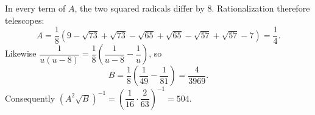In every term of $A$, the two squared radicals differ by $8$. Rationalization therefore telescopes:
\[
A=\dfrac{1}{8}(9-\sqrt{73}+\sqrt{73}-\sqrt{65}+\sqrt{65}-\sqrt{57}+\sqrt{57}-7)=\dfrac{1}{4}.
\]
Likewise $\dfrac{1}{u(u-8)}=\dfrac{1}{8}(\dfrac{1}{u-8}-\dfrac{1}{u})$, so
\[
B=\dfrac{1}{8}\left(\dfrac{1}{49}-\dfrac{1}{81}\right)=\dfrac{4}{3969}.
\]
Consequently $(A^2\sqrt B)^{-1}=(\dfrac{1}{16}\cdot\dfrac{2}{63})^{-1}=\boxed{504}$.
